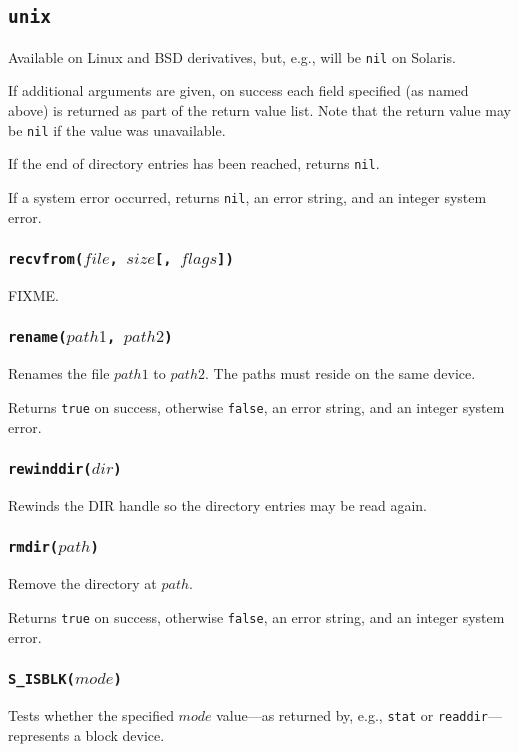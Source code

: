 \documentclass[11pt, oneside]{memoir}
\newcommand*{\true}[0]{\texttt{true}\xspace}
\newcommand*{\false}[0]{\texttt{false}\xspace}
\newcommand*{\nil}[0]{\texttt{nil}\xspace}
\newcommand*{\syscall}[1]{\texttt{#1}\xspace}
\newcommand*{\fn}[1]{\texttt{#1}\xspace}
\newcounter{toccols}
\newenvironment{Module}[1]{
	\subsection{\texttt{#1}}
	\addtocontents{toc}{
		\protect\begin{multicols}{\value{toccols}}
	}
}{
	\addtocontents{toc}{\protect\end{multicols}}
}
\begin{document}
\begin{Module}{unix}
\begin{description}
Available on Linux and BSD derivatives, but, e.g., will be \nil on Solaris.
\end{description}

If additional arguments are given, on success each field specified (as named above) is returned as part of the return value list. Note that the return value may be \nil if the value was unavailable.

If the end of directory entries has been reached, returns \nil.

If a system error occurred, returns \nil, an error string, and an integer system error.

\subsubsection[\fn{recvfrom}]{\fn{recvfrom($file$, $size$[, $flags$])}}

FIXME.

\subsubsection[\fn{rename}]{\fn{rename($path1$, $path2$)}}

Renames the file $path1$ to $path2$. The paths must reside on the same device.

Returns \true on success, otherwise \false, an error string, and an integer system error.

\subsubsection[\fn{rewinddir}]{\fn{rewinddir($dir$)}}

Rewinds the DIR handle so the directory entries may be read again.

\subsubsection[\fn{rmdir}]{\fn{rmdir($path$)}}

Remove the directory at $path$.

Returns \true on success, otherwise \false, an error string, and an integer system error.

\subsubsection[\fn{S\_ISBLK}]{\fn{S\_ISBLK($mode$)}}

Tests whether the specified $mode$ value---as returned by, e.g., \syscall{stat} or \syscall{readdir}---represents a block device.


\end{Module}
\end{document}
